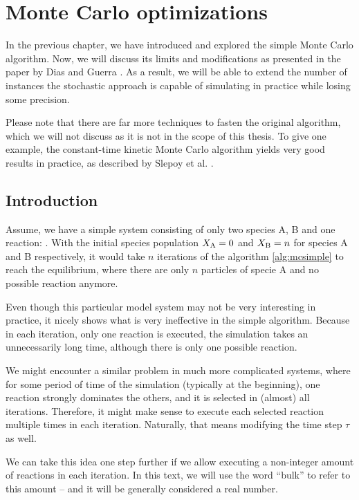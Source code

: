 \chapter{Monte Carlo optimizations}

In the previous chapter, we have introduced and explored the simple Monte Carlo algorithm. Now, we will discuss its limits and modifications as presented in the paper by Dias and Guerra \cite{tiago20}. As a result, we will be able to extend the number of instances the stochastic approach is capable of simulating in practice while losing some precision.

Please note that there are far more techniques to fasten the original algorithm, which we will not discuss as it is not in the scope of this thesis. To give one example, the constant-time kinetic Monte Carlo algorithm yields very good results in practice, as described by Slepoy et al. \cite{constant-time}. 

\section{Introduction}

Assume, we have a simple system consisting of only two species A, B and one reaction: . With the initial species population $X_{\rm{A}} = 0$ and $X_{\rm{B}} = n$ for species A and B respectively, it would take $n$ iterations of the algorithm \ref{alg:mcsimple} to reach the equilibrium, where there are only $n$ particles of specie A and no possible reaction anymore. 

Even though this particular model system may not be very interesting in practice, it nicely shows what is very ineffective in the simple algorithm. Because in each iteration, only one reaction is executed, the simulation takes an unnecessarily long time, although there is only one possible reaction. 

We might encounter a similar problem in much more complicated systems, where for some period of time of the simulation (typically at the beginning), one reaction strongly dominates the others, and it is selected in (almost) all iterations. Therefore, it might make sense to execute each selected reaction multiple times in each iteration. Naturally, that means modifying the time step $\tau$ as well.

We can take this idea one step further if we allow executing a non-integer amount of reactions in each iteration. In this text, we will use the word ``bulk'' to refer to this amount -- and it will be generally considered a real number.

